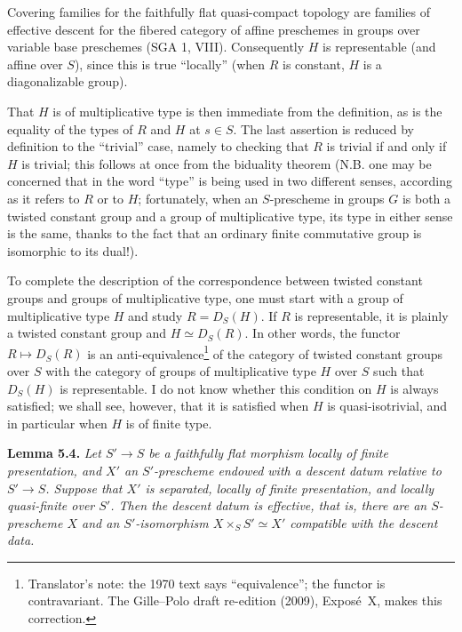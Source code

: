 Covering families for the faithfully flat quasi-compact topology are
families of effective descent for the fibered category of affine
preschemes in groups over variable base preschemes (SGA 1, VIII).
Consequently \(H\) is representable (and affine over \(S\)), since this is
true ``locally''
(when \(R\) is constant, \(H\) is a diagonalizable group).

That \(H\) is of multiplicative type is then immediate from the definition,
as is the equality of the types of \(R\) and \(H\) at \(s\in S\). The last
assertion is reduced by definition to the ``trivial'' case, namely to
checking that \(R\) is trivial if and only if \(H\) is trivial; this follows
at once from the biduality theorem  (N.B. one may be concerned
that in  the word ``type'' is being used in two different senses,
according as it refers to \(R\) or to \(H\); fortunately, when an
\(S\)-prescheme in groups \(G\) is both a twisted constant group and a group
of multiplicative type, its type in either sense is the same, thanks to the
fact that an ordinary finite commutative group is isomorphic to its dual!).

To complete the description of the correspondence between twisted constant
groups and groups of multiplicative type, one must start with a group of
multiplicative type \(H\) and study \(R=D_S(H)\). If \(R\) is
representable, it is plainly a twisted constant group and
\(H\simeq D_S(R)\). In other words, the functor \(R\mapsto D_S(R)\) is an
anti-equivalence\footnote{Translator's note: the 1970 text says
``equivalence''; the functor is contravariant. The Gille--Polo draft
re-edition (2009), Expos\'e~X, makes this correction.} of the category of
twisted constant groups over \(S\) with the category of groups of
multiplicative type \(H\) over \(S\) such that \(D_S(H)\) is representable. I
do not know whether this condition on \(H\) is always satisfied; we shall
see, however, that it is satisfied when \(H\) is quasi-isotrivial, and in
particular when \(H\) is of finite type.

\par\medskip\noindent
\textbf{Lemma 5.4.}\enspace
\begingroup\itshape
Let \(S'\to S\) be a faithfully flat morphism locally of finite
presentation, and \(X'\) an \(S'\)-prescheme endowed with a descent datum
relative to \(S'\to S\). Suppose that \(X'\) is separated, locally of finite
presentation, and locally quasi-finite over \(S'\). Then the descent datum
is effective, that is, there are an \(S\)-prescheme \(X\) and an
\(S'\)-isomorphism \(X\times_S S'\simeq X'\) compatible with the descent
data.
\par\endgroup

